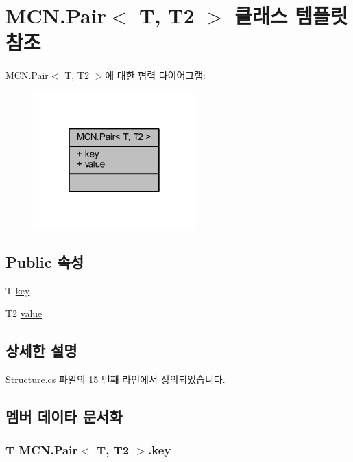 \hypertarget{class_m_c_n_1_1_pair}{}\section{M\+C\+N.\+Pair$<$ T, T2 $>$ 클래스 템플릿 참조}
\label{class_m_c_n_1_1_pair}


M\+C\+N.\+Pair$<$ T, T2 $>$에 대한 협력 다이어그램\+:\nopagebreak
\begin{figure}[H]
\begin{center}
\leavevmode
\includegraphics[width=178pt]{class_m_c_n_1_1_pair__coll__graph}
\end{center}
\end{figure}
\subsection*{Public 속성}
\begin{DoxyCompactItemize}
\item 
T \hyperlink{class_m_c_n_1_1_pair_a62c546d3829b8819a65f8c9d64200338}{key}
\item 
T2 \hyperlink{class_m_c_n_1_1_pair_a1980bbf37b60fcbfea22382f71250e84}{value}
\end{DoxyCompactItemize}


\subsection{상세한 설명}


Structure.\+cs 파일의 15 번째 라인에서 정의되었습니다.



\subsection{멤버 데이타 문서화}
\subsubsection[{\texorpdfstring{key}{key}}]{\setlength{\rightskip}{0pt plus 5cm}T {\bf M\+C\+N.\+Pair}$<$ T, T2 $>$.key}\hypertarget{class_m_c_n_1_1_pair_a62c546d3829b8819a65f8c9d64200338}{}\label{class_m_c_n_1_1_pair_a62c546d3829b8819a65f8c9d64200338}


